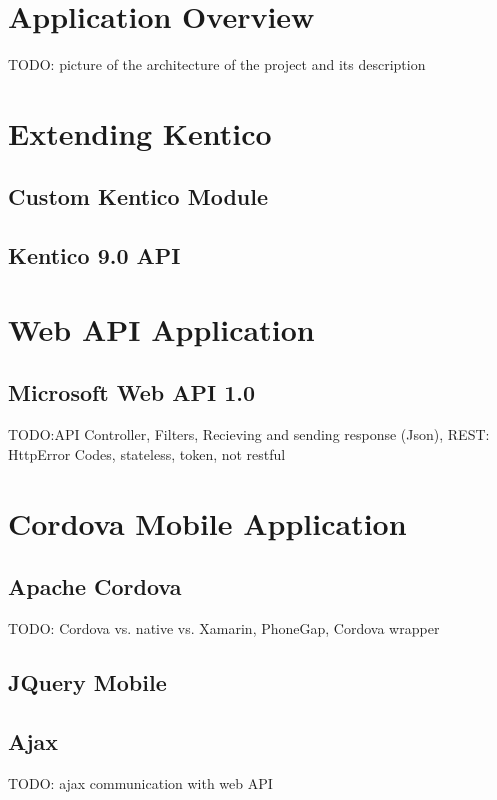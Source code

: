 \section{Application Overview}
TODO: picture of the architecture of the project and its description

\section{Extending Kentico} \label{implExtendingKentico}
\subsection{Custom Kentico Module}
\subsection{Kentico 9.0 API}

\section{Web API Application}
\subsection{Microsoft Web API 1.0}
TODO:API Controller, Filters, Recieving and sending response (Json), REST: HttpError Codes, stateless, token, not restful

\section{Cordova Mobile Application}
\subsection{Apache Cordova}
TODO: Cordova vs. native vs. Xamarin, PhoneGap, Cordova wrapper
\subsection{JQuery Mobile}
\subsection{Ajax}
TODO: ajax communication with web API


